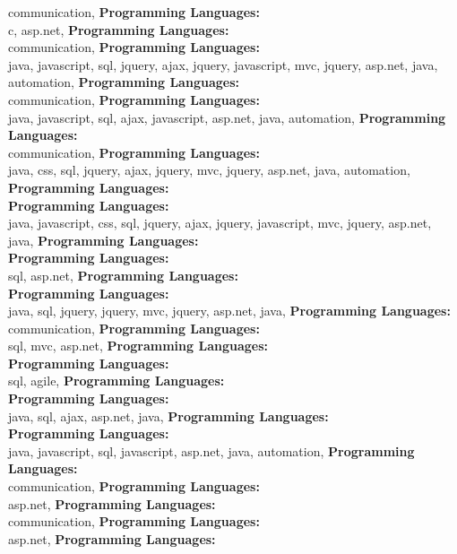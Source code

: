communication, \textbf{Programming Languages:} \\
c, asp.net, \textbf{Programming Languages:} \\
communication, \textbf{Programming Languages:} \\
java, javascript, sql, jquery, ajax,  jquery, javascript, mvc, jquery, asp.net, java, automation, \textbf{Programming Languages:} \\
communication, \textbf{Programming Languages:} \\
java, javascript, sql, ajax, javascript, asp.net, java, automation, \textbf{Programming Languages:} \\
communication, \textbf{Programming Languages:} \\
java, css, sql, jquery, ajax,  jquery, mvc, jquery, asp.net, java, automation, \textbf{Programming Languages:} \\
\textbf{Programming Languages:} \\
java, javascript, css, sql, jquery, ajax,  jquery, javascript, mvc, jquery, asp.net, java, \textbf{Programming Languages:} \\
\textbf{Programming Languages:} \\
sql, asp.net, \textbf{Programming Languages:} \\
\textbf{Programming Languages:} \\
java, sql, jquery,  jquery, mvc, jquery, asp.net, java, \textbf{Programming Languages:} \\
communication, \textbf{Programming Languages:} \\
sql, mvc, asp.net, \textbf{Programming Languages:} \\
\textbf{Programming Languages:} \\
sql, agile, \textbf{Programming Languages:} \\
\textbf{Programming Languages:} \\
java, sql, ajax, asp.net, java, \textbf{Programming Languages:} \\
\textbf{Programming Languages:} \\
java, javascript, sql, javascript, asp.net, java, automation, \textbf{Programming Languages:} \\
communication, \textbf{Programming Languages:} \\
asp.net, \textbf{Programming Languages:} \\
communication, \textbf{Programming Languages:} \\
asp.net, \textbf{Programming Languages:} \\

